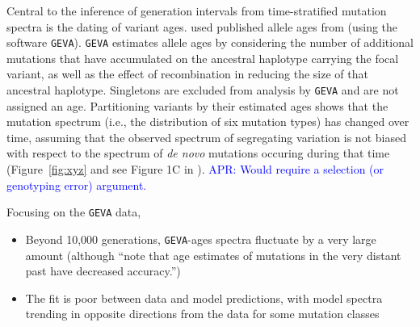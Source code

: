 \documentclass[]{article}
\newcommand{\aprcomment}[1]{{\textcolor{blue}{APR: #1}}}
\newcommand{\GEVA}{\texttt{GEVA}\xspace}
\begin{document}
Central to the inference of generation intervals from time-stratified mutation
spectra is the dating of variant ages. \citet{wang2023human} used published
allele ages from \citet{albers2020dating} (using the software \GEVA).
\GEVA estimates allele ages by considering the number of additional
mutations that have accumulated on the ancestral haplotype carrying the focal
variant, as well as the effect of recombination in reducing the size of that
ancestral haplotype. Singletons are excluded from analysis by \GEVA and
are not assigned an age. Partitioning variants by their estimated ages shows
that the mutation spectrum (i.e., the distribution of six mutation types) has
changed over time, assuming that the observed spectrum of segregating variation
is not biased with respect to the spectrum of \emph{de novo} mutations occuring
during that time (Figure~\ref{fig:xyz} and see Figure 1C in
\citeauthor{wang2023human}). \aprcomment{Would require a selection (or
genotyping error) argument.}

Focusing on the \GEVA data,
\begin{itemize}
    \item Beyond 10,000 generations, \GEVA-ages spectra fluctuate by a
        very large amount (although \citet{wang2023human} ``note that age
        estimates of mutations in the very distant past have decreased
        accuracy.'')
    \item The fit is poor between data and model predictions, with model
        spectra trending in opposite directions from the data for some
        mutation classes \citep{gao2022limited}
\end{itemize}
\end{document}
